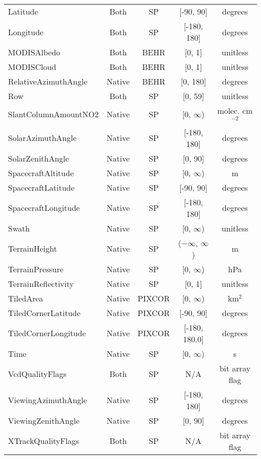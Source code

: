 \documentclass[12pt]{article}
\begin{document}
\begin{center}
\begin{longtable}{lcccc}
	Latitude				& 	Both 		&	SP			&	[-90, 90] & degrees \\
	Longitude			& 	Both 		& 	SP			&	[-180, 180] & degrees \\
	MODISAlbedo			&	Both		 	&	BEHR			&	[0, 1]	 & unitless \\
	MODISCloud			&	Both 		&	BEHR			&	[0, 1]	 & unitless \\
	RelativeAzimuthAngle &	Native	 	&	BEHR			&	[0, 180] & degrees \\
	Row					&	Both 		&	SP			&   [0, 59]	& unitless \\
	SlantColumnAmountNO2 & 	Native	 	&	SP			& 	[0, $\infty$) & molec. cm$^{-2}$ \\
	SolarAzimuthAngle	&	Native	 	&	SP			&	[-180, 180] & degrees \\
	SolarZenithAngle		&	Native	 	&	SP			&	[0, 90]		& degrees \\
	SpacecraftAltitude	&	Native		&	SP			&	[0, $\infty$)	& m \\
	SpacecraftLatitude	&	Native		&	SP			&	[-90, 90]	& degrees \\
	SpacecraftLongitude	&	Native		&	SP			&	[-180, 180]	& degrees \\
	Swath				&	Native	 	&	SP			&	[0, $\infty$)	& unitless \\
	TerrainHeight		&	Native	 	& 	SP			&	($-\infty$, $\infty$) 	& m \\
	TerrainPressure		&	Native	 	& 	SP			&	[0, $\infty$) 	& hPa \\
	TerrainReflectivity	&	Native 		&	SP			&	[0, 1]		& unitless \\
	TiledArea			&	Native		& 	PIXCOR		&	[0, $\infty$) & km$^{2}$ \\
	TiledCornerLatitude	&	Native		&	PIXCOR		&	[-90, 90] & degrees \\
	TiledCornerLongitude &	Native		&	PIXCOR		&	[-180, 180.0] & degrees \\
	Time					&	Native	 	&	SP			&	[0, $\infty$)	& s \\
	VcdQualityFlags		&	Both 		&	SP			&	N/A				& bit array flag \\
	ViewingAzimuthAngle	&	Native	 	&	SP			&	[-180, 180]	& degrees \\
	ViewingZenithAngle	&	Native	 	&	SP			&	[0, 90]		& degrees \\
	XTrackQualityFlags	&	Both 		&	SP			&	N/A				& bit array flag \\
	
	\end{longtable}

	\end{center}
\end{document}
